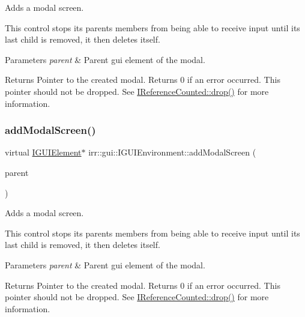 Adds a modal screen. 

This control stops its parent\textquotesingle{}s members from being able to receive input until its last child is removed, it then deletes itself. 
\begin{DoxyParams}{Parameters}
{\em parent} & Parent gui element of the modal. \\
\hline
\end{DoxyParams}
\begin{DoxyReturn}{Returns}
Pointer to the created modal. Returns 0 if an error occurred. This pointer should not be dropped. See \hyperlink{classirr_1_1IReferenceCounted_a03856a09355b89d178090c4a5f738543}{I\+Reference\+Counted\+::drop()} for more information. 
\end{DoxyReturn}
\mbox{\label{classirr_1_1gui_1_1IGUIEnvironment_a8bdf2e97e3694da75205ad693d849219}} 
\subsubsection{\texorpdfstring{add\+Modal\+Screen()}{addModalScreen()}\hspace{0.1cm}{\footnotesize\ttfamily [2/2]}}
{\footnotesize\ttfamily virtual \hyperlink{classirr_1_1gui_1_1IGUIElement}{I\+G\+U\+I\+Element}$\ast$ irr\+::gui\+::\+I\+G\+U\+I\+Environment\+::add\+Modal\+Screen (\begin{DoxyParamCaption}\item[{\hyperlink{classirr_1_1gui_1_1IGUIElement}{I\+G\+U\+I\+Element} $\ast$}]{parent }\end{DoxyParamCaption})\hspace{0.3cm}{\ttfamily [pure virtual]}}



Adds a modal screen. 

This control stops its parent\textquotesingle{}s members from being able to receive input until its last child is removed, it then deletes itself. 
\begin{DoxyParams}{Parameters}
{\em parent} & Parent gui element of the modal. \\
\hline
\end{DoxyParams}
\begin{DoxyReturn}{Returns}
Pointer to the created modal. Returns 0 if an error occurred. This pointer should not be dropped. See \hyperlink{classirr_1_1IReferenceCounted_a03856a09355b89d178090c4a5f738543}{I\+Reference\+Counted\+::drop()} for more information. 
\end{DoxyReturn}
\mbox{\label{classirr_1_1gui_1_1IGUIEnvironment_aff82c4b3935eaf56ce638996f5e002c9}} 
